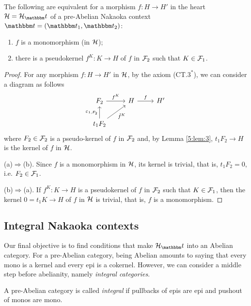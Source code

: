 \begin{prop}\label{prop:1.4}
  \begin{sloppypar}
    The following are equivalent for a morphism ${f\colon H\to H'}$ in the heart $\clH=\clH_\t$ of a pre-Abelian Nakaoka context ${\t=(\t_1,\t_2)}$:
  \begin{enumerate}[label=(\alph*)]
    \item $f$ is a monomorphism (in $\mathcal{H}$);
    \item\label{prop:1.4:b} there is a pseudokernel $f^K\colon K\to H$ of $f$ in $\mathcal{F}_2$ such that ${K\in \mathcal{F}_1}$.
  \end{enumerate}
\end{sloppypar}
\end{prop}
\begin{proof}
  For any morphism $f\colon H\to H'$ in $\mathcal{H}$, by the axiom (CT.$3^*$), we can consider a diagram as follows
  \begin{equation*}
    \begin{tikzcd}
      F_2\arrow{r}{f^K} & H\arrow{r}{f} & H'\\
      t_1{F_2}\arrow{u}{\varepsilon_{1,F_2}}\arrow{ur}[']{\tilde{f}^K}
    \end{tikzcd}
  \end{equation*}
  where $F_2\in \mathcal{F}_2$ is a pseudo-kernel of $f$ in $\mathcal{F}_2$ and, by Lemma \ref{5:lem:3}, $t_1F_2\to H$ is the kernel of $f$ in $\mathcal{H}$.

  \smallskip\noindent
  (a)$\Rightarrow$(b). Since $f$ is a monomorphism in $\mathcal{H}$, its kernel is trivial, that is, $t_1F_2=0$, i.e. $F_2\in \mathcal{F}_1$.

  \smallskip\noindent
  (b)$\Rightarrow$(a). If  $f^K\colon K\to H$ is a pseudokernel of $f$ in $\mathcal{F}_2$ such that $K\in \mathcal{F}_1$, then the kernel $0=t_1K\to H$ of $f$ in $\mathcal{H}$ is trivial, that is, $f$ is a monomorphism.
\end{proof}

\subsection{Integral Nakaoka contexts}

Our final objective is to find conditions that make $\clH_\t$ into an Abelian category. For a pre-Abelian category, being Abelian amounts to saying that every mono is a kernel and every epi is a cokernel. However, we can consider a middle step before abelianity, namely \emph{integral categories}.

\begin{definition}
  A pre-Abelian category is called \emph{integral} if pullbacks of epis are epi and pushout of monos are mono.
\end{definition}

